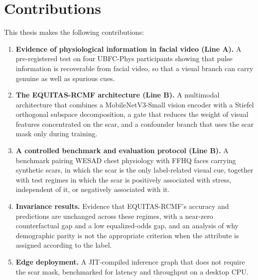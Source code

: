 \section{Contributions}
This thesis makes the following contributions:
\begin{enumerate}
    \item \textbf{Evidence of physiological information in facial video (Line A).} A pre-registered test on four UBFC-Phys participants showing that pulse information is recoverable from facial video, so that a visual branch can carry genuine as well as spurious cues.
    \item \textbf{The EQUITAS-RCMF architecture (Line B).} A multimodal architecture that combines a MobileNetV3-Small vision encoder with a Stiefel orthogonal subspace decomposition, a gate that reduces the weight of visual features concentrated on the scar, and a confounder branch that uses the scar mask only during training.
    \item \textbf{A controlled benchmark and evaluation protocol (Line B).} A benchmark pairing WESAD chest physiology with FFHQ faces carrying synthetic scars, in which the scar is the only label-related visual cue, together with test regimes in which the scar is positively associated with stress, independent of it, or negatively associated with it.
    \item \textbf{Invariance results.} Evidence that EQUITAS-RCMF's accuracy and predictions are unchanged across these regimes, with a near-zero counterfactual gap and a low equalized-odds gap, and an analysis of why demographic parity is not the appropriate criterion when the attribute is assigned according to the label.
    \item \textbf{Edge deployment.} A JIT-compiled inference graph that does not require the scar mask, benchmarked for latency and throughput on a desktop CPU.
\end{enumerate}
